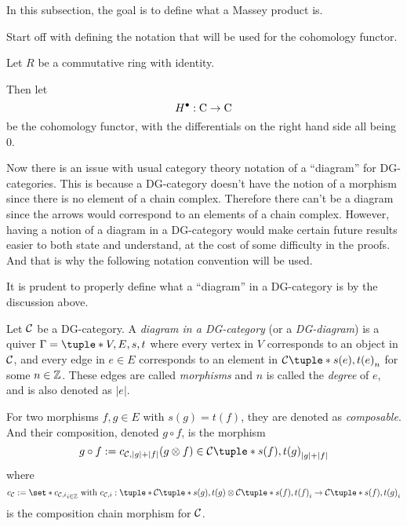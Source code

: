 In this subsection, the goal is to define what a Massey product is.

Start off with defining the notation that will be used for the cohomology functor.

\begin{notation}
    Let \( R \) be a commutative ring with identity.

    Then let
    \[
        H^\bullet: \operatorname{C} \to \operatorname{C}
    \]
    be the cohomology functor, with the differentials on the right hand side all being \( 0 \).
\end{notation}

Now there is an issue with usual category theory notation of a ``diagram'' for DG-categories. This is because a DG-category doesn't have the notion of a morphism since there is no element of a chain complex. Therefore there can't be a diagram since the arrows would correspond to an elements of a chain complex. However, having a notion of a diagram in a DG-category would make certain future results easier to both state and understand, at the cost of some difficulty in the proofs. And that is why the following notation convention will be used.

\begin{notation}
    It is prudent to properly define what a ``diagram'' in a DG-category is by the discussion above.

    Let \( {\mathcal{C}} \) be a DG-category. A \emph{diagram in a DG-category} (or a \emph{DG-diagram}) is a quiver \( \Gamma = \tuple*{V, E, s, t} \) where every vertex in \( V \) corresponds to an object in \( {\mathcal{C}} \), and every edge in \( e \in E \) corresponds to an element in \( \Cc\tuple*{s(e), t(e)}_n \) for some \( n \in {\mathbb{Z}} \). These edges are called \emph{morphisms} and \( n \) is called the \emph{degree} of \( e \), and is also denoted as \( |e| \).

    For two morphisms \( f, g \in E \) with \( s(g) = t(f) \), they are denoted as \emph{composable}. And their composition, denoted \( g \circ f \), is the morphism
    \[
        g \circ f := c_{\Cc, |g| + |f|}(g \otimes f) \in \Cc\tuple*{s(f), t(g)}_{|g| + |f|}
    \]
    where
    \[
        c_{\Cc} := \set*{c_{\Cc, i}}_{i \in \Zb} \text{ with } c_{\Cc, i}: \tuple*{ \Cc\tuple*{s(g), t(g)} \otimes \Cc\tuple*{s(f), t(f)} }_i \to \Cc\tuple*{s(f), t(g)}_i
    \]
    is the composition chain morphism for \( {\mathcal{C}} \).
\end{notation}

